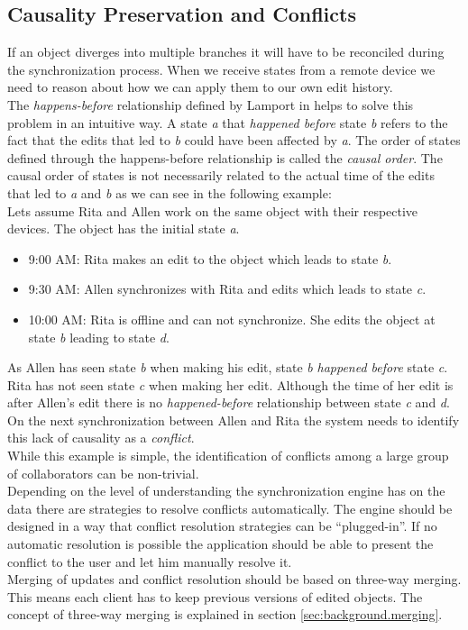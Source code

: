 \subsection{Causality Preservation and Conflicts}
\label{sec:requirements.causality}
If an object diverges into multiple branches it will have to be reconciled during the synchronization process.
When we receive states from a remote device we need to reason about how we can apply them to our own edit history.\\
The \emph{happens-before} relationship defined by Lamport in \cite{Lamport:1978tr} helps to solve this problem in an intuitive way.
A state \emph{a} that \emph{happened before} state \emph{b} refers to the fact that the edits that led to \emph{b} could have been affected by \emph{a}. The order of states defined through the happens-before relationship is called the \emph{causal order}.
The causal order of states is not necessarily related to the actual time of the edits that led to \emph{a} and \emph{b} as we can see in the following example:\\

Lets assume Rita and Allen work on the same object with their respective devices.
The object has the initial state \emph{a}.

\begin{itemize}
\item 9:00 AM: Rita makes an edit to the object which leads to state \emph{b}.
\item 9:30 AM: Allen synchronizes with Rita and edits which leads to state \emph{c}.
\item 10:00 AM: Rita is offline and can not synchronize. She edits the object at state \emph{b} leading to state \emph{d}. 
\end{itemize}

As Allen has seen state \emph{b} when making his edit, state \emph{b} \emph{happened before} state \emph{c}.\\
Rita has not seen state \emph{c} when making her edit.
Although the time of her edit is after Allen's edit there is no \emph{happened-before} relationship between state \emph{c} and \emph{d}.\\
On the next synchronization between Allen and Rita the system needs to identify this lack of causality as a \emph{conflict}.\\
While this example is simple, the identification of conflicts among a large group of collaborators can be non-trivial.\\
Depending on the level of understanding the synchronization engine has on the data there are strategies to resolve conflicts automatically.
The engine should be designed in a way that conflict resolution strategies can be ``plugged-in''.
If no automatic resolution is possible the application should be able to present the conflict to the user and let him manually resolve it.\\
Merging of updates and conflict resolution should be based on three-way merging.
This means each client has to keep previous versions of edited objects.
The concept of three-way merging is explained in section \ref{sec:background.merging}.

